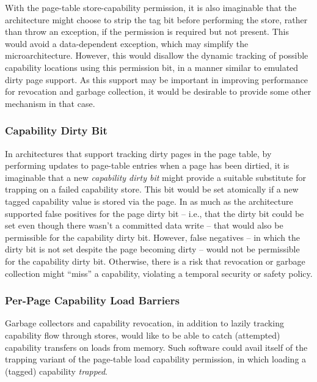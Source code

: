 \begin{description}
With the page-table store-capability permission, it is also imaginable that
the architecture might choose to strip the tag bit before performing the
store, rather than throw an exception, if the permission is required but not
present.
This would avoid a data-dependent exception, which may simplify the
microarchitecture.
However, this would disallow the dynamic tracking of possible capability
locations using this permission bit, in a manner similar to emulated dirty
page support.
As this support may be important in improving performance for revocation and
garbage collection, it would be desirable to provide some other mechanism in
that case.
\end{description}

\subsubsection{Capability Dirty Bit}

In architectures that support tracking dirty pages in the page table, by
performing updates to page-table entries when a page has been dirtied, it is
imaginable that a new \textit{capability dirty bit} might provide a suitable
substitute for trapping on a failed capability store.
This bit would be set atomically if a new tagged capability value is stored
via the page.
In as much as the architecture supported false positives for the page dirty
bit -- i.e., that the dirty bit could be set even though there wasn't a
committed data write -- that would also be permissible for the capability
dirty bit.
However, false negatives -- in which the dirty bit is not set despite the
page becoming dirty -- would not be permissible for the capability dirty bit.
Otherwise, there is a risk that revocation or garbage collection might
``miss'' a capability, violating a temporal security or safety policy.

\subsubsection{Per-Page Capability Load Barriers}
\label{section:capability-load-barriers}

Garbage collectors and capability revocation, in addition to lazily tracking
capability flow through stores, would like to be able to catch (attempted)
capability transfers on loads from memory.  Such software could avail itself of
the trapping variant of the page-table load capability permission, in
which loading a (tagged) capability \emph{trapped}.

